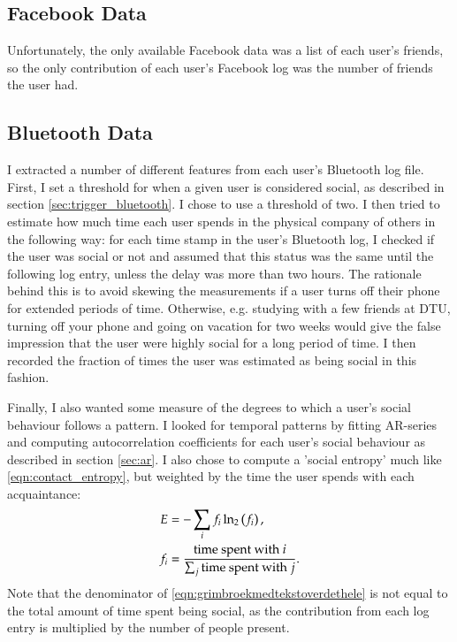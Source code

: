 \subsection{Facebook Data}
Unfortunately, the only available Facebook data was a list of each user's friends, so the only contribution of each user's Facebook log was the number of friends the user had.

\subsection{Bluetooth Data}
I extracted a number of different features from each user's Bluetooth log file. First, I set a threshold for when a given user is considered social, as described in section \ref{sec:trigger_bluetooth}. I chose to use a threshold of two. I then tried to estimate how much time each user spends in the physical company of others in the following way: for each time stamp in the user's Bluetooth log, I checked if the user was social or not and assumed that this status was the same until the following log entry, unless the delay was more than two hours. The rationale behind this is to avoid skewing the measurements if a user turns off their phone for extended periods of time. Otherwise, e.g. studying with a few friends at DTU, turning off your phone and going on vacation for two weeks would give the false impression that the user were highly social for a long period of time. I then recorded the fraction of times the user was estimated as being social in this fashion.

Finally, I also wanted some measure of the degrees to which a user's social behaviour follows a pattern. I looked for temporal patterns by fitting AR-series and computing autocorrelation coefficients for each user's social behaviour as described in section \ref{sec:ar}. I also chose to compute a 'social entropy' much like \eqref{eqn:contact_entropy}, but weighted by the time the user spends with each acquaintance:
\begin{align}
	E &= -\sum_i f_i \ln_2\left( f_i \right), \\
	f_i &= \frac{\text{time spent with $i$}}{\sum_j\text{time spent with $j$}}. \label{eqn:grimbroekmedtekstoverdethele}
\end{align}
Note that the denominator of \eqref{eqn:grimbroekmedtekstoverdethele} is not equal to the total amount of time spent being social, as the contribution from each log entry is multiplied by the number of people present.

